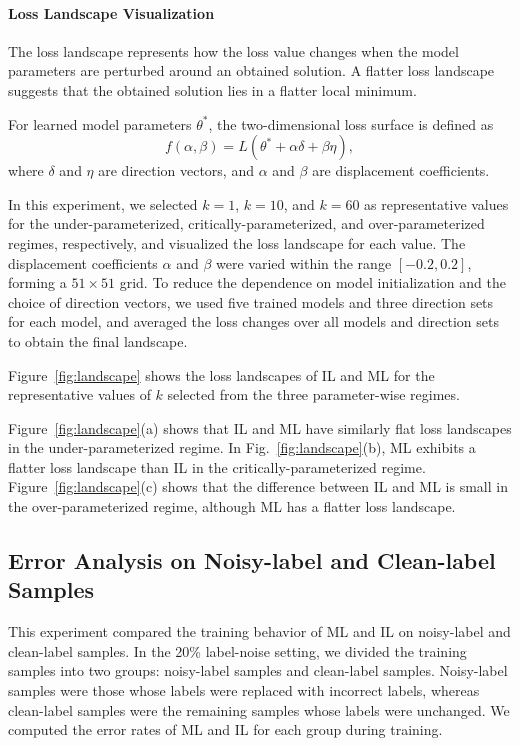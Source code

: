 \documentclass[dvipdfmx]{nolta}        %
\begin{document}
\paragraph{Loss Landscape Visualization}

The loss landscape represents how the loss value changes when the model parameters are perturbed around an obtained solution. A flatter loss landscape suggests that the obtained solution lies in a flatter local minimum\cite{li_visualizing_2018}.

For learned model parameters $\theta^{*}$, the two-dimensional loss surface is defined as
\[
f(\alpha, \beta)
=
L(\theta^{*} + \alpha \delta + \beta \eta),
\]
where $\delta$ and $\eta$ are direction vectors, and $\alpha$ and $\beta$ are displacement coefficients.

In this experiment, we selected $k=1$, $k=10$, and $k=60$ as representative values for the under-parameterized, critically-parameterized, and over-parameterized regimes, respectively, and visualized the loss landscape for each value. The displacement coefficients $\alpha$ and $\beta$ were varied within the range $[-0.2,0.2]$, forming a $51\times51$ grid. To reduce the dependence on model initialization and the choice of direction vectors, we used five trained models and three direction sets for each model, and averaged the loss changes over all models and direction sets to obtain the final landscape.

Figure~\ref{fig:landscape} shows the loss landscapes of IL and ML for the representative values of $k$ selected from the three parameter-wise regimes.

Figure~\ref{fig:landscape}(a) shows that IL and ML have similarly flat loss landscapes in the under-parameterized regime. In Fig.~\ref{fig:landscape}(b), ML exhibits a flatter loss landscape than IL in the critically-parameterized regime. Figure~\ref{fig:landscape}(c) shows that the difference between IL and ML is small in the over-parameterized regime, although ML has a flatter loss landscape.

\subsection{Error Analysis on Noisy-label and Clean-label Samples}
This experiment compared the training behavior of ML and IL on noisy-label and clean-label samples.
In the 20\% label-noise setting, we divided the training samples into two groups: noisy-label samples and clean-label samples. Noisy-label samples were those whose labels were replaced with incorrect labels, whereas clean-label samples were the remaining samples whose labels were unchanged. We computed the error rates of ML and IL for each group during training.
\end{document}
